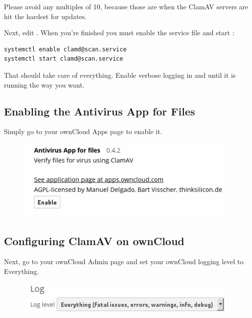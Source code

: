 \documentclass[letterpaper,10pt,english]{sphinxmanual}
\begin{document}
Please avoid any multiples of 10, because those are when the ClamAV servers are
hit the hardest for updates.

Next, edit . When you're finished you must enable
the  service file and start :

\begin{Verbatim}[commandchars=\\\{\}]
systemctl enable clamd@scan.service
systemctl start clamd@scan.service
\end{Verbatim}

That should take care of everything. Enable verbose logging in 
and  until it is running the way you want.


\subsection{Enabling the Antivirus App for Files}
\label{configuration_server/antivirus_configuration:enabling-the-antivirus-app-for-files}
Simply go to your ownCloud Apps page to enable it.
\begin{figure}[htbp]
\centering

\includegraphics{antivirus-app.png}
\end{figure}


\subsection{Configuring ClamAV on ownCloud}
\label{configuration_server/antivirus_configuration:configuring-clamav-on-owncloud}
Next, go to your ownCloud Admin page and set your ownCloud logging level to
Everything.
\begin{figure}[htbp]
\centering

\includegraphics{antivirus-logging.png}
\end{figure}
\end{document}
